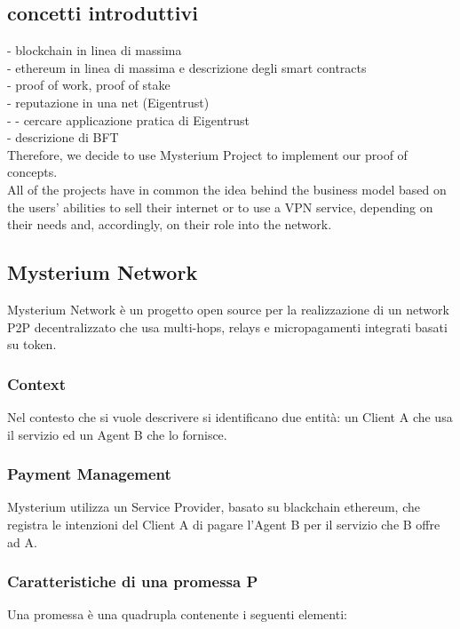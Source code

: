 \documentclass[]{article}
\begin{document}
	\subsection{concetti introduttivi}
	 - blockchain in linea di massima\\
	 - ethereum in linea di massima e descrizione degli smart contracts\\
	 - proof of work, proof of stake\\
	 - reputazione in una net (Eigentrust)\\
	 - - cercare applicazione pratica di Eigentrust\\
	 - descrizione di BFT\\
	
	Therefore, we decide to use Mysterium Project to implement our proof of concepts.\\
	All of the projects have in common the idea behind the business model based on the users' abilities to sell their internet or to use a VPN service, depending on their needs and, accordingly, on their role into the network.
	
	
	\subsection{Mysterium Network}
	Mysterium Network è un progetto open source per la realizzazione di un network P2P decentralizzato che usa multi-hops, relays e micropagamenti integrati basati su token.	
	
	\subsubsection{Context}
	Nel contesto che si vuole descrivere si identificano due entità: un Client A che usa il servizio ed un Agent B che lo fornisce.	
	\subsubsection{Payment Management}
	Mysterium utilizza un Service Provider, basato su blackchain ethereum, che registra le intenzioni del Client A di pagare l’Agent B per il servizio che B offre ad A.	
	
	\subsubsection{Caratteristiche di una promessa P}
	Una promessa è una quadrupla contenente i seguenti elementi:
	
\end{document}

